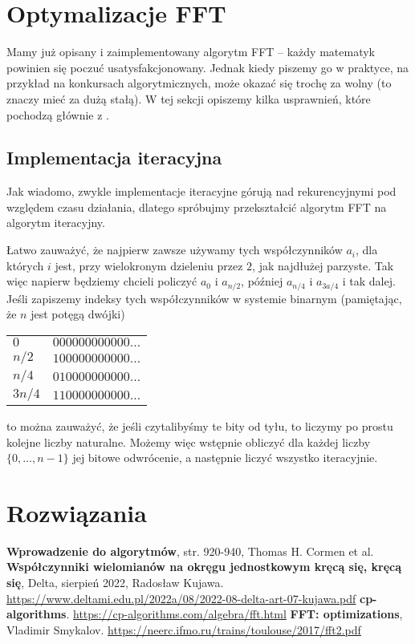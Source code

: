 \documentclass[11pt]{scrartcl}
\begin{document}
\section{Optymalizacje FFT}
    Mamy już opisany i zaimplementowany algorytm FFT -- każdy matematyk powinien się poczuć usatysfakcjonowany. Jednak kiedy piszemy go w praktyce, na przykład na konkursach algorytmicznych, może okazać się trochę za wolny (to znaczy mieć za dużą stałą). W tej sekcji opiszemy kilka usprawnień, które pochodzą głównie z \cite{ref:Smykalov}.

    \subsection{Implementacja iteracyjna}
    Jak wiadomo, zwykle implementacje iteracyjne górują nad rekurencyjnymi pod względem czasu działania, dlatego spróbujmy przekształcić algorytm FFT na algorytm iteracyjny.

    Łatwo zauważyć, że najpierw zawsze używamy tych współczynników $a_i$, dla których $i$ jest, przy wielokronym dzieleniu przez $2$, jak najdłużej parzyste. Tak więc napierw będziemy chcieli policzyć $a_0$ i $a_{n/2}$, później $a_{n/4}$ i $a_{3a/4}$ i tak dalej. Jeśli zapiszemy indeksy tych współczynników w systemie binarnym (pamiętając, że $n$ jest potęgą dwójki)
    \begin{center}
        \begin{tabular}{ l c }
            $0$    & $000000000000\ldots$ \\
            $n/2$  & $100000000000\ldots$ \\
            $n/4$  & $010000000000\ldots$ \\
            $3n/4$ & $110000000000\ldots$ \\
        \end{tabular}
    \end{center}
    to można zauważyć, że jeśli czytalibyśmy te bity od tyłu, to liczymy po prostu kolejne liczby naturalne. Możemy więc wstępnie obliczyć dla każdej liczby $\{0, \ldots, n-1\}$ jej bitowe odwrócenie, a następnie liczyć wszystko iteracyjnie.

\section{Rozwiązania}
    \makeanswers

\begin{thebibliography}{9}
     \textbf{Wprowadzenie do algorytmów}, str. 920-940, Thomas H. Cormen et al.
     \textbf{Współczynniki wielomianów na okręgu jednostkowym kręcą się, kręcą się}, Delta, sierpień 2022, Radosław Kujawa.
        \url{https://www.deltami.edu.pl/2022a/08/2022-08-delta-art-07-kujawa.pdf}
     \textbf{cp-algorithms}.
        \url{https://cp-algorithms.com/algebra/fft.html}
     \textbf{FFT: optimizations}, Vladimir Smykalov.
        \url{https://neerc.ifmo.ru/trains/toulouse/2017/fft2.pdf}
\end{thebibliography}
\end{document}
